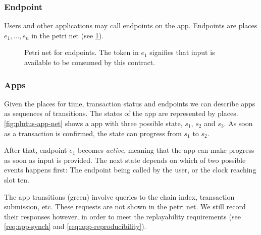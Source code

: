 
\subsubsection{Endpoint}

Users and other applications may call endpoints on the \gls{app}.
Endpoints are places $e_1, \ldots, e_n$ in the petri net (see \ref{fig:petri-net-endpoint}).

\begin{figure}
  \centering
\caption{Petri net for endpoints. The token in $e_1$ signifies that input is available to be consumed by this contract.}
\label{fig:petri-net-endpoint}
\end{figure}

\subsubsection{Apps}

Given the places for time, transaction status and endpoints we can describe \glspl{app} as sequences of transitions.
The states of the app are represented by places.
\ref{fig:plutus-app-net} shows a \gls{app} with three possible state, $s_1$, $s_2$ and $s_3$.
As soon as a transaction is confirmed, the state can progress from $s_1$ to $s_2$.

After that, endpoint $e_1$ becomes \emph{active}, meaning that the app can make progress as soon as input is provided. The next state depends on which of two possible events happens first: The endpoint being called by the user, or the clock reaching slot ten.

The app transitions (green) involve queries to the chain index, transaction submission, etc.
These requests are not shown in the petri net.
We still record their responses however, in order to meet the replayability requirements (see \ref{req:app-synch} and \ref{req:app-reproducibility}).

